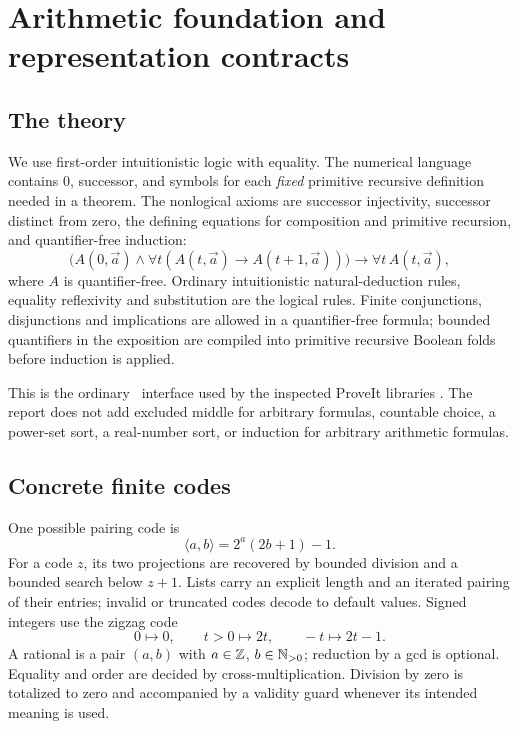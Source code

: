 \section{Arithmetic foundation and representation contracts}
\label{sec:arithmetic}

\subsection{The theory}

We use first-order intuitionistic logic with equality. The numerical language contains $0$, successor, and symbols for each \emph{fixed} primitive recursive definition needed in a theorem. The nonlogical axioms are successor injectivity, successor distinct from zero, the defining equations for composition and primitive recursion, and quantifier-free induction:
\[
 \bigl(A(0,\vec a)\wedge
   \forall t(A(t,\vec a)\to A(t+1,\vec a))\bigr)
       \longrightarrow \forall t\,A(t,\vec a),
\]
where $A$ is quantifier-free. Ordinary intuitionistic natural-deduction rules, equality reflexivity and substitution are the logical rules. Finite conjunctions, disjunctions and implications are allowed in a quantifier-free formula; bounded quantifiers in the exposition are compiled into primitive recursive Boolean folds before induction is applied.

This is the ordinary \ipra\ interface used by the inspected ProveIt libraries \cite{RepoReadme,RepoNative}. The report does not add excluded middle for arbitrary formulas, countable choice, a power-set sort, a real-number sort, or induction for arbitrary arithmetic formulas.

\subsection{Concrete finite codes}

One possible pairing code is
\[
 \langle a,b\rangle=2^a(2b+1)-1.
\]
For a code $z$, its two projections are recovered by bounded division and a bounded search below $z+1$. Lists carry an explicit length and an iterated pairing of their entries; invalid or truncated codes decode to default values. Signed integers use the zigzag code
\[
 0\mapsto0,\qquad t>0\mapsto2t,\qquad -t\mapsto2t-1.
\]
A rational is a pair $(a,b)$ with $a\in\mathbb Z$, $b\in\mathbb N_{>0}$; reduction by a gcd is optional. Equality and order are decided by cross-multiplication. Division by zero is totalized to zero and accompanied by a validity guard whenever its intended meaning is used.

